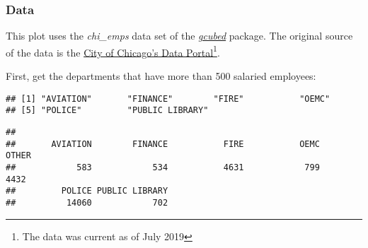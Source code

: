 \documentclass[]{book}
\newenvironment{Shaded}{\begin{snugshade}}{\end{snugshade}}
\newcommand{\DecValTok}[1]{\textcolor[rgb]{0.00,0.00,0.81}{#1}}
\newcommand{\KeywordTok}[1]{\textcolor[rgb]{0.13,0.29,0.53}{\textbf{#1}}}
\newcommand{\NormalTok}[1]{#1}
\newcommand{\OperatorTok}[1]{\textcolor[rgb]{0.81,0.36,0.00}{\textbf{#1}}}
\newcommand{\StringTok}[1]{\textcolor[rgb]{0.31,0.60,0.02}{#1}}
\let\rmarkdownfootnote\footnote%
\def\footnote{\protect\rmarkdownfootnote}
\begin{document}
\hypertarget{chiridgesdata}{%
\subsubsection*{Data}\label{chiridgesdata}}

This plot uses the \emph{chi\_emps} data set of the \protect\hyperlink{gcubed}{\emph{gcubed}} package.
The original source of the data is the \href{https://data.cityofchicago.org/Administration-Finance/Current-Employee-Names-Salaries-and-Position-Title/xzkq-xp2w}{City of Chicago's Data Portal}\footnote{The data was current as of July 2019}.

First, get the departments that have more than 500 salaried employees:

\begin{Shaded}
\end{Shaded}

\begin{verbatim}
## [1] "AVIATION"       "FINANCE"        "FIRE"           "OEMC"          
## [5] "POLICE"         "PUBLIC LIBRARY"
\end{verbatim}

\begin{Shaded}
\end{Shaded}

\begin{verbatim}
## 
##       AVIATION        FINANCE           FIRE           OEMC          OTHER 
##            583            534           4631            799           4432 
##         POLICE PUBLIC LIBRARY 
##          14060            702
\end{verbatim}
\end{document}
